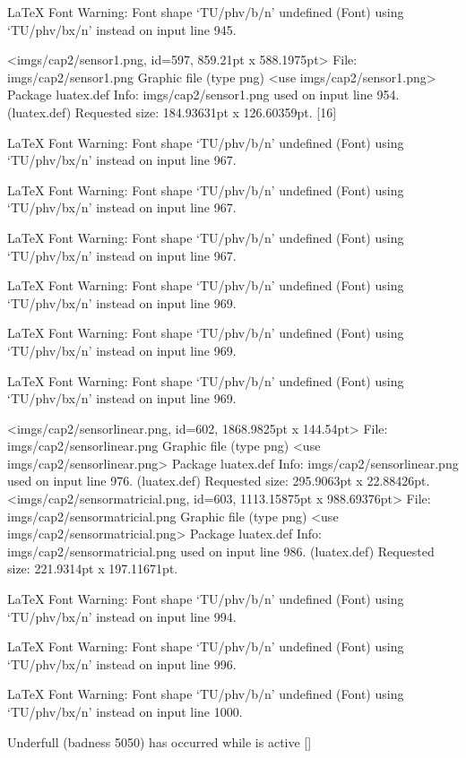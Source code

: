 LaTeX Font Warning: Font shape `TU/phv/b/n' undefined
(Font)              using `TU/phv/bx/n' instead on input line 945.

<imgs/cap2/sensor1.png, id=597, 859.21pt x 588.1975pt>
File: imgs/cap2/sensor1.png Graphic file (type png)
<use imgs/cap2/sensor1.png>
Package luatex.def Info: imgs/cap2/sensor1.png  used on input line 954.
(luatex.def)             Requested size: 184.93631pt x 126.60359pt.
[16]

LaTeX Font Warning: Font shape `TU/phv/b/n' undefined
(Font)              using `TU/phv/bx/n' instead on input line 967.


LaTeX Font Warning: Font shape `TU/phv/b/n' undefined
(Font)              using `TU/phv/bx/n' instead on input line 967.


LaTeX Font Warning: Font shape `TU/phv/b/n' undefined
(Font)              using `TU/phv/bx/n' instead on input line 967.


LaTeX Font Warning: Font shape `TU/phv/b/n' undefined
(Font)              using `TU/phv/bx/n' instead on input line 969.


LaTeX Font Warning: Font shape `TU/phv/b/n' undefined
(Font)              using `TU/phv/bx/n' instead on input line 969.


LaTeX Font Warning: Font shape `TU/phv/b/n' undefined
(Font)              using `TU/phv/bx/n' instead on input line 969.

<imgs/cap2/sensorlinear.png, id=602, 1868.9825pt x 144.54pt>
File: imgs/cap2/sensorlinear.png Graphic file (type png)
<use imgs/cap2/sensorlinear.png>
Package luatex.def Info: imgs/cap2/sensorlinear.png  used on input line 976.
(luatex.def)             Requested size: 295.9063pt x 22.88426pt.
<imgs/cap2/sensormatricial.png, id=603, 1113.15875pt x 988.69376pt>
File: imgs/cap2/sensormatricial.png Graphic file (type png)
<use imgs/cap2/sensormatricial.png>
Package luatex.def Info: imgs/cap2/sensormatricial.png  used on input line 986.
(luatex.def)             Requested size: 221.9314pt x 197.11671pt.

LaTeX Font Warning: Font shape `TU/phv/b/n' undefined
(Font)              using `TU/phv/bx/n' instead on input line 994.


LaTeX Font Warning: Font shape `TU/phv/b/n' undefined
(Font)              using `TU/phv/bx/n' instead on input line 996.


LaTeX Font Warning: Font shape `TU/phv/b/n' undefined
(Font)              using `TU/phv/bx/n' instead on input line 1000.


Underfull \vbox (badness 5050) has occurred while \output is active []

